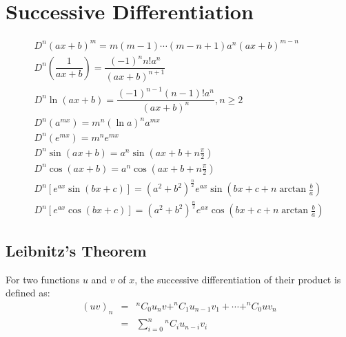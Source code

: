 \chapter{Successive Differentiation}
\begin{align}
	D^n (ax+b)^m=m(m-1)\cdots(m-n+1) a^n (ax+b)^{m-n}\\
	D^n \left(\dfrac{1}{ax+b}\right)=\dfrac{(-1)^n n!a^n}{(ax+b)^{n+1}}\\
	D^n \ln(ax+b)=\dfrac{(-1)^{n-1} (n-1)!a^n}{(ax+b)^n}, n \geq 2\\
	D^n (a^{mx})=m^n (\ln a)^n a^{mx}\\
	D^n (e^{mx})=m^n e^{mx}\\
	D^n \sin (ax+b)=a^n \sin(ax+b+n\frac{\pi}{2})\\
	D^n \cos (ax+b)=a^n \cos(ax+b+n\frac{\pi}{2})\\
	D^n [e^{ax} \sin(bx+c)]=(a^2+b^2)^{\frac{n}{2}} e^{ax} \sin(bx+c+n\arctan\frac{b}{a})\\
	D^n [e^{ax} \cos(bx+c)]=(a^2+b^2)^{\frac{n}{2}} e^{ax} \cos(bx+c+n\arctan\frac{b}{a})
\end{align}


\section{Leibnitz's Theorem}
For two functions $u$ and $v$ of $x$, the successive differentiation of their product is defined as:
\begin{equation}
	\begin{aligned}
			(uv)_n & = &^nC_0 u_n v+^nC_1 u_{n-1} v_1+\cdots+^nC_0 u v_n\\
			& = & \sum_{i=0}^n {^nC_i} u_{n-i} v_i
	\end{aligned}
\end{equation}
